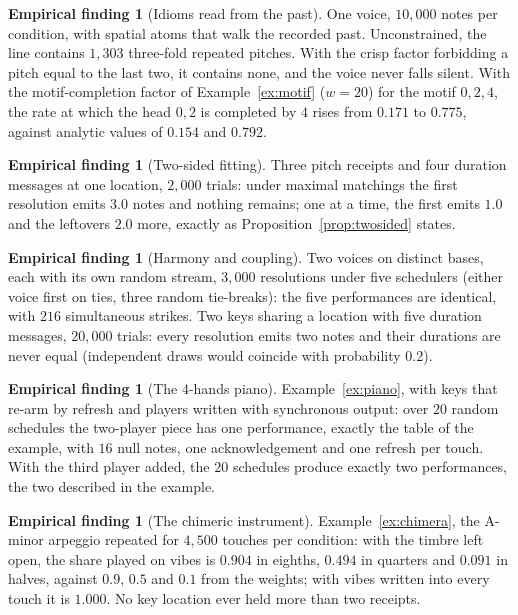 \documentclass[11pt,a4paper]{article}
\theoremstyle{plain}
\theoremstyle{definition}
\newtheorem{finding}[theorem]{Empirical finding}
\theoremstyle{remark}
\begin{document}
\begin{finding}[Idioms read from the past]\label{find:idioms}
One voice, $10{,}000$ notes per condition, with spatial atoms that walk the
recorded past. Unconstrained, the line contains $1{,}303$ three-fold repeated
pitches. With the crisp factor forbidding a pitch equal to the last two, it
contains none, and the voice never falls silent. With the motif-completion
factor of Example~\ref{ex:motif} ($w = 20$) for the motif $0,2,4$, the rate at
which the head $0,2$ is completed by $4$ rises from $0.171$ to $0.775$, against
analytic values of $0.154$ and $0.792$.
\end{finding}

\begin{finding}[Two-sided fitting]\label{find:twosided}
Three pitch receipts and four duration messages at one location, $2{,}000$
trials: under maximal matchings the first resolution emits $3.0$ notes and
nothing remains; one at a time, the first emits $1.0$ and the leftovers $2.0$
more, exactly as Proposition~\ref{prop:twosided} states.
\end{finding}

\begin{finding}[Harmony and coupling]\label{find:harmony}
Two voices on distinct bases, each with its own random stream, $3{,}000$
resolutions under five schedulers (either voice first on ties, three random
tie-breaks): the five performances are identical, with $216$ simultaneous
strikes. Two keys sharing a location with five duration messages, $20{,}000$
trials: every resolution emits two notes and their durations are never equal
(independent draws would coincide with probability $0.2$).
\end{finding}

\begin{finding}[The $4$-hands piano]\label{find:piano}
Example~\ref{ex:piano}, with keys that re-arm by refresh and players written with
synchronous output: over $20$ random schedules the two-player piece has one
performance, exactly the table of the example, with $16$ null notes, one
acknowledgement and one refresh per touch. With the third player added, the $20$
schedules produce exactly two performances, the two described in the example.
\end{finding}

\begin{finding}[The chimeric instrument]\label{find:chimera}
Example~\ref{ex:chimera}, the A-minor arpeggio repeated for $4{,}500$ touches per
condition: with the timbre left open, the share played on vibes is $0.904$ in
eighths, $0.494$ in quarters and $0.091$ in halves, against $0.9$, $0.5$ and $0.1$
from the weights; with vibes written into every touch it is $1.000$. No key
location ever held more than two receipts.
\end{finding}
\end{document}
